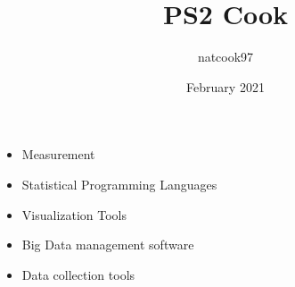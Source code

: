 

\title{PS2 Cook}
\author{natcook97 }
\date{February 2021}

\begin{itemize}
    \item Measurement
    \item Statistical Programming Languages
    \item Visualization Tools
    \item Big Data management software
    \item Data collection tools
\end{itemize}



